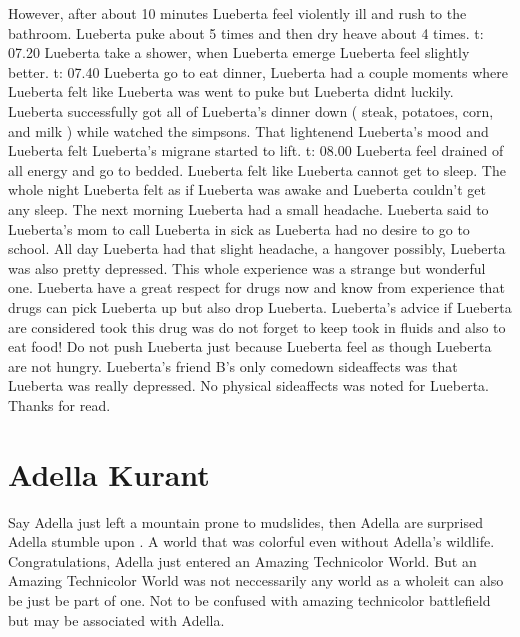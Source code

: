 \documentclass[12pt]{book}
\begin{document}
However, after about 10 minutes Lueberta feel violently ill and rush to the bathroom. Lueberta puke about 5 times and then dry heave about 4 times. t: 07.20 Lueberta take a shower, when Lueberta emerge Lueberta feel slightly better. t: 07.40 Lueberta go to eat dinner, Lueberta had a couple moments where Lueberta felt like Lueberta was went to puke but Lueberta didnt luckily. Lueberta successfully got all of Lueberta's dinner down ( steak, potatoes, corn, and milk ) while watched the simpsons. That lightenend Lueberta's mood and Lueberta felt Lueberta's migrane started to lift. t: 08.00 Lueberta feel drained of all energy and go to bedded. Lueberta felt like Lueberta cannot get to sleep. The whole night Lueberta felt as if Lueberta was awake and Lueberta couldn't get any sleep. The next morning Lueberta had a small headache. Lueberta said to Lueberta's mom to call Lueberta in sick as Lueberta had no desire to go to school. All day Lueberta had that slight headache, a hangover possibly, Lueberta was also pretty depressed. This whole experience was a strange but wonderful one. Lueberta have a great respect for drugs now and know from experience that drugs can pick Lueberta up but also drop Lueberta. Lueberta's advice if Lueberta are considered took this drug was do not forget to keep took in fluids and also to eat food! Do not push Lueberta just because Lueberta feel as though Lueberta are not hungry. Lueberta's friend B's only comedown sideaffects was that Lueberta was really depressed. No physical sideaffects was noted for Lueberta. Thanks for read.






\chapter{Adella Kurant}

Say Adella just left a mountain prone to mudslides, then Adella are surprised Adella stumble upon . A world that was colorful even without Adella's wildlife. Congratulations, Adella just entered an Amazing Technicolor World. But an Amazing Technicolor World was not neccessarily any world as a wholeit can also be just be part of one. Not to be confused with amazing technicolor battlefield but may be associated with Adella.
\end{document}
